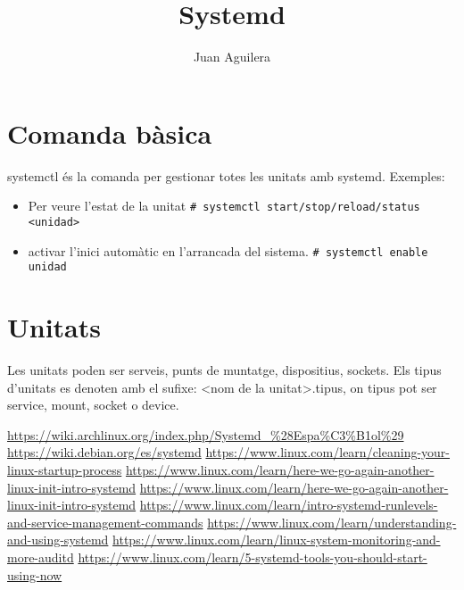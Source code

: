 \documentclass[a4paper]{article}
\begin{document}
\title{Systemd}
\author{Juan Aguilera}
\maketitle

\begin{comment}
oddsidemargin \the\oddsidemargin \newline
textwidth \the\textwidth \newline
marginparsep \the\marginparsep \newline
marginparwidth \the\marginparwidth \newline
hoffset \the\hoffset \newline
paperwidth \the\paperwidth 
\end{comment}

\section{Comanda bàsica}
systemctl és la comanda per gestionar totes les unitats amb systemd. Exemples:
\begin{itemize}
	\item Per veure l'estat de la unitat  \newline
	\verb+# systemctl start/stop/reload/status <unidad>+ 
	\item activar l'inici automàtic en l'arrancada del sistema. \newline
	\verb+# systemctl enable unidad+ 
\end{itemize}

\section{Unitats}

Les unitats poden ser serveis, punts de muntatge, dispositius, sockets. Els tipus d'unitats es denoten amb el sufixe: <nom de la unitat>.tipus, on tipus pot ser service, mount, socket o device.

\begin{thebibliography}{99}
	 \url{https://wiki.archlinux.org/index.php/Systemd_%28Espa%C3%B1ol%29}
	 \url{https://wiki.debian.org/es/systemd}
	 \url{https://www.linux.com/learn/cleaning-your-linux-startup-process}
	 \url{https://www.linux.com/learn/here-we-go-again-another-linux-init-intro-systemd}
	 \url{https://www.linux.com/learn/here-we-go-again-another-linux-init-intro-systemd}
	 \url{https://www.linux.com/learn/intro-systemd-runlevels-and-service-management-commands}
	 \url{https://www.linux.com/learn/understanding-and-using-systemd}
	\url{https://www.linux.com/learn/linux-system-monitoring-and-more-auditd}
	\url{https://www.linux.com/learn/5-systemd-tools-you-should-start-using-now}	

	
\end{thebibliography}
\end{document}
